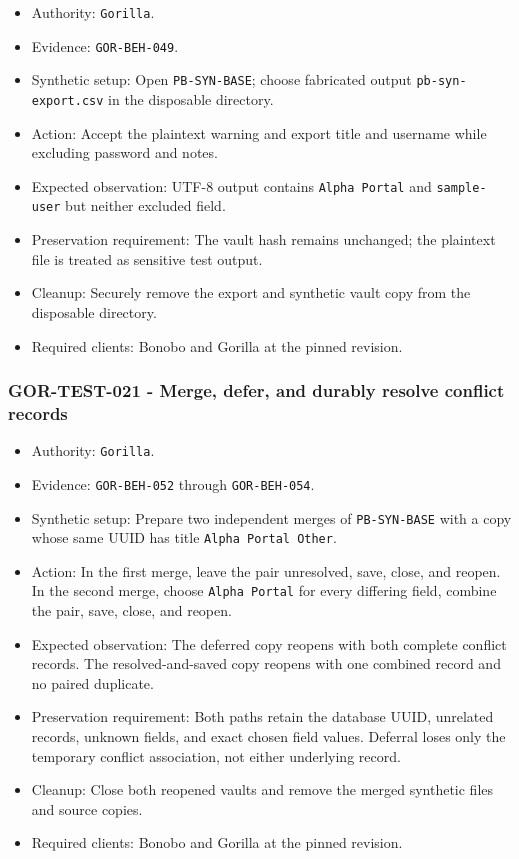 \documentclass[
  letterpaper,
]{article}
\newcommand{\passthrough}[1]{#1}
\providecommand{\tightlist}{%
  \setlength{\itemsep}{0pt}\setlength{\parskip}{0pt}}
\begin{document}
\begin{itemize}
\tightlist
\item
  Authority: \passthrough{\lstinline!Gorilla!}.
\item
  Evidence: \nolinkurl{GOR-BEH-049}.
\item
  Synthetic setup: Open \nolinkurl{PB-SYN-BASE}; choose fabricated output \nolinkurl{pb-syn-export.csv} in the
  disposable directory.
\item
  Action: Accept the plaintext warning and export title and username while excluding password and notes.
\item
  Expected observation: UTF-8 output contains \passthrough{\lstinline!Alpha Portal!} and \nolinkurl{sample-user} but
  neither excluded field.
\item
  Preservation requirement: The vault hash remains unchanged; the plaintext file is treated as sensitive test output.
\item
  Cleanup: Securely remove the export and synthetic vault copy from the disposable directory.
\item
  Required clients: Bonobo and Gorilla at the pinned revision.
\end{itemize}

\subsubsection{GOR-TEST-021 - Merge, defer, and durably resolve conflict
records}\label{gor-test-021---merge-defer-and-durably-resolve-conflict-records}

\begin{itemize}
\tightlist
\item
  Authority: \passthrough{\lstinline!Gorilla!}.
\item
  Evidence: \nolinkurl{GOR-BEH-052} through \nolinkurl{GOR-BEH-054}.
\item
  Synthetic setup: Prepare two independent merges of \nolinkurl{PB-SYN-BASE} with a copy whose same UUID has title
  \passthrough{\lstinline!Alpha Portal Other!}.
\item
  Action: In the first merge, leave the pair unresolved, save, close, and reopen. In the second merge, choose
  \passthrough{\lstinline!Alpha Portal!} for every differing field, combine the pair, save, close, and reopen.
\item
  Expected observation: The deferred copy reopens with both complete conflict records. The resolved-and-saved copy
  reopens with one combined record and no paired duplicate.
\item
  Preservation requirement: Both paths retain the database UUID, unrelated records, unknown fields, and exact chosen
  field values. Deferral loses only the temporary conflict association, not either underlying record.
\item
  Cleanup: Close both reopened vaults and remove the merged synthetic files and source copies.
\item
  Required clients: Bonobo and Gorilla at the pinned revision.
\end{itemize}
\end{document}
